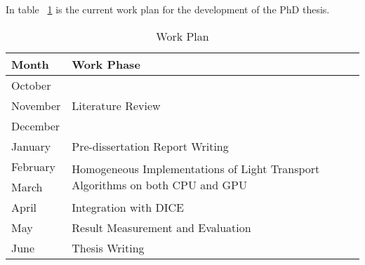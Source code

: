 
In table ~\ref{tab:work_plan} is the current work plan for the development of the PhD thesis.

\begin{table}[h]
\centering
\begin{tabular}{|l|l|}
\hline
\textbf{Month} & \textbf{Work Phase} \\ \hline
October & \multirow{3}{*}{Literature Review} \\ \cline{1-1}
November &  \\ \cline{1-1}
December &  \\ \hline
January & Pre-dissertation Report Writing \\ \hline
February & \multirow{2}{*}{Homogeneous Implementations of Light Transport Algorithms on both CPU and GPU} \\ \cline{1-1}
March &  \\ \hline
April & Integration with DICE \\ \hline
May & Result Measurement and Evaluation \\ \hline
June & Thesis Writing \\ \hline
\end{tabular}
\caption{\label{tab:work_plan} Work Plan}
\end{table}